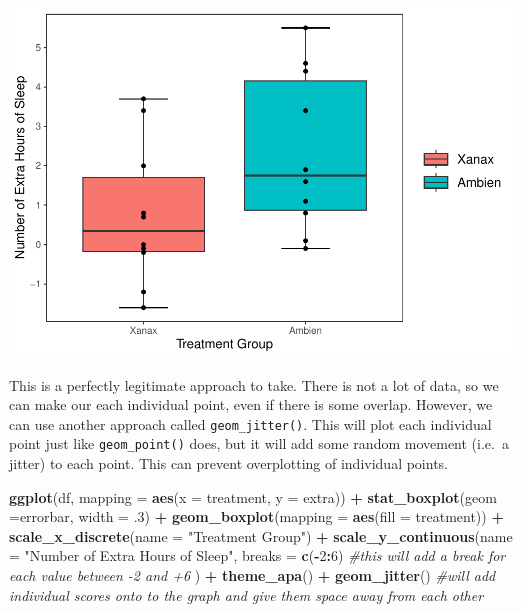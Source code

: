\documentclass[
]{book}
\newenvironment{Shaded}{\begin{snugshade}}{\end{snugshade}}
\newcommand{\AttributeTok}[1]{\textcolor[rgb]{0.13,0.29,0.53}{#1}}
\newcommand{\CommentTok}[1]{\textcolor[rgb]{0.56,0.35,0.01}{\textit{#1}}}
\newcommand{\DecValTok}[1]{\textcolor[rgb]{0.00,0.00,0.81}{#1}}
\newcommand{\FunctionTok}[1]{\textcolor[rgb]{0.13,0.29,0.53}{\textbf{#1}}}
\newcommand{\NormalTok}[1]{#1}
\newcommand{\SpecialCharTok}[1]{\textcolor[rgb]{0.81,0.36,0.00}{\textbf{#1}}}
\newcommand{\StringTok}[1]{\textcolor[rgb]{0.31,0.60,0.02}{#1}}
\begin{document}
\includegraphics{rintro_demo_files/figure-latex/unnamed-chunk-300-1.pdf}

This is a perfectly legitimate approach to take. There is not a lot of data, so we can make our each individual point, even if there is some overlap. However, we can use another approach called \texttt{geom\_jitter()}. This will plot each individual point just like \texttt{geom\_point()} does, but it will add some random movement (i.e.~a jitter) to each point. This can prevent overplotting of individual points.

\begin{Shaded}
\begin{Highlighting}[]
\FunctionTok{ggplot}\NormalTok{(df, }\AttributeTok{mapping =} \FunctionTok{aes}\NormalTok{(}\AttributeTok{x =}\NormalTok{ treatment, }\AttributeTok{y =}\NormalTok{ extra)) }\SpecialCharTok{+} 
  \FunctionTok{stat\_boxplot}\NormalTok{(}\AttributeTok{geom =}\StringTok{\textquotesingle{}errorbar\textquotesingle{}}\NormalTok{, }\AttributeTok{width =}\NormalTok{ .}\DecValTok{3}\NormalTok{) }\SpecialCharTok{+}
  \FunctionTok{geom\_boxplot}\NormalTok{(}\AttributeTok{mapping =} \FunctionTok{aes}\NormalTok{(}\AttributeTok{fill =}\NormalTok{ treatment)) }\SpecialCharTok{+} 
  \FunctionTok{scale\_x\_discrete}\NormalTok{(}\AttributeTok{name =} \StringTok{"Treatment Group"}\NormalTok{) }\SpecialCharTok{+} 
  \FunctionTok{scale\_y\_continuous}\NormalTok{(}\AttributeTok{name =} \StringTok{"Number of Extra Hours of Sleep"}\NormalTok{, }
                     \AttributeTok{breaks =} \FunctionTok{c}\NormalTok{(}\SpecialCharTok{{-}}\DecValTok{2}\SpecialCharTok{:}\DecValTok{6}\NormalTok{) }\CommentTok{\#this will add a break for each value between {-}2 and +6}
\NormalTok{                     ) }\SpecialCharTok{+}
  \FunctionTok{theme\_apa}\NormalTok{() }\SpecialCharTok{+} 
  \FunctionTok{geom\_jitter}\NormalTok{() }\CommentTok{\#will add individual scores onto to the graph and give them space away from each other}
\end{Highlighting}
\end{Shaded}
\end{document}

